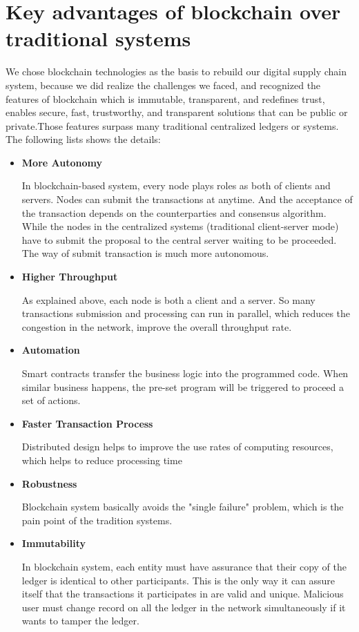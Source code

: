 \section{Key advantages of blockchain over traditional systems}
We chose blockchain technologies  as the basis to rebuild our digital supply chain system, because we did realize the challenges we faced, and recognized the features of blockchain which is immutable, transparent, and redefines trust, enables secure, fast, trustworthy, and transparent solutions that can be public or private.Those features surpass many traditional centralized ledgers or systems. The following lists shows the details:

\begin{itemize}
	\item \textbf{More Autonomy}
	
	 In blockchain-based system, every node plays roles as both of clients and servers. Nodes can submit the transactions at anytime. And the acceptance of the transaction depends on the counterparties and consensus algorithm. While the nodes in the centralized systems (traditional client-server mode) have to submit the proposal to the central server waiting to be proceeded. The way of submit transaction is much more autonomous.
	 
	\item \textbf{Higher Throughput} 
	
	As explained above, each node is both a client and a server. So many transactions submission and processing can run in parallel, which reduces the congestion in the network, improve the overall throughput rate.
	 
	\item \textbf{Automation}
	
	Smart contracts transfer the business logic into the programmed code. When similar business happens, the pre-set program will be triggered to proceed a set of actions.
	
	\item \textbf{Faster Transaction Process}
	
	Distributed design helps to improve the use rates of computing resources, which helps to reduce processing time
	
	\item \textbf{Robustness}
	
	Blockchain system basically avoids the "single failure" problem, which is the pain point of the tradition systems.
	
	\item \textbf{Immutability}
	
	In blockchain system, each entity must have assurance that their copy of the ledger is identical to other participants. This is the only way it can assure itself that the transactions it participates in are valid and unique. Malicious user must change record on all the ledger in the network simultaneously if it wants to tamper the ledger. 
\end{itemize}

